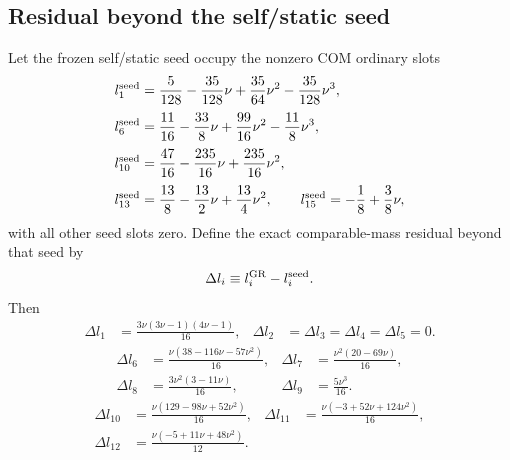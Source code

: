 \documentclass[11pt]{article}
\begin{document}
\subsection{Residual beyond the self/static seed}
\label{app:gr-com-target-residual}

Let the frozen self/static seed occupy the nonzero COM ordinary slots
\begin{align}
 l_1^{\rm seed}&=\frac{5}{128}-\frac{35}{128}\nu+\frac{35}{64}\nu^2-\frac{35}{128}\nu^3,
\label{eq:app-gr-com-target-seed-l1}
\\[0.5ex]
 l_6^{\rm seed}&=\frac{11}{16}-\frac{33}{8}\nu+\frac{99}{16}\nu^2-\frac{11}{8}\nu^3,
\label{eq:app-gr-com-target-seed-l6}
\\[0.5ex]
 l_{10}^{\rm seed}&=\frac{47}{16}-\frac{235}{16}\nu+\frac{235}{16}\nu^2,
\label{eq:app-gr-com-target-seed-l10}
\\[0.5ex]
 l_{13}^{\rm seed}&=\frac{13}{8}-\frac{13}{2}\nu+\frac{13}{4}\nu^2,
\qquad
 l_{15}^{\rm seed}=-\frac18+\frac38\nu,
\label{eq:app-gr-com-target-seed-l13-l15}
\end{align}
with all other seed slots zero. Define the exact comparable-mass residual beyond
that seed by
\begin{equation}
 \Delta l_i\equiv l_i^{\rm GR}-l_i^{\rm seed}.
\label{eq:app-gr-com-target-delta-l-def}
\end{equation}
Then
\begin{equation}
\begin{aligned}
 \Delta l_1&=\frac{3\nu(3\nu-1)(4\nu-1)}{16},
 & \Delta l_2&=\Delta l_3=\Delta l_4=\Delta l_5=0.
\end{aligned}
\label{eq:app-gr-com-target-delta-l-1-5}
\end{equation}
\begin{equation}
\begin{aligned}
 \Delta l_6&=\frac{\nu(38-116\nu-57\nu^2)}{16},
 & \Delta l_7&=\frac{\nu^2(20-69\nu)}{16},
\\[0.5ex]
 \Delta l_8&=\frac{3\nu^2(3-11\nu)}{16},
 & \Delta l_9&=\frac{5\nu^3}{16}.
\end{aligned}
\label{eq:app-gr-com-target-delta-l-6-9}
\end{equation}
\begin{equation}
\begin{aligned}
 \Delta l_{10}&=\frac{\nu(129-98\nu+52\nu^2)}{16},
 & \Delta l_{11}&=\frac{\nu(-3+52\nu+124\nu^2)}{16},
\\[0.5ex]
 \Delta l_{12}&=\frac{\nu(-5+11\nu+48\nu^2)}{12}.
\end{aligned}
\label{eq:app-gr-com-target-delta-l-10-12}
\end{equation}
\end{document}
